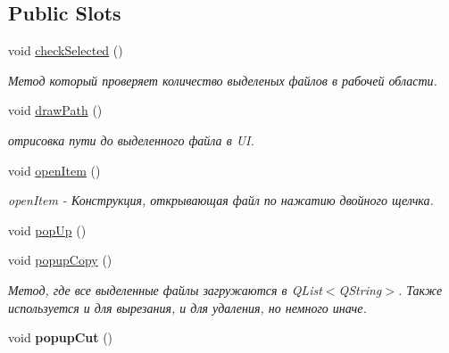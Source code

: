 \subsection*{Public Slots}
\begin{DoxyCompactItemize}
\item 
\mbox{\label{class_custom_tree_adad1ea5f153ee963af8ec30725c56023}} 
void \hyperlink{class_custom_tree_adad1ea5f153ee963af8ec30725c56023}{check\+Selected} ()
\begin{DoxyCompactList}\small\item\em Метод который проверяет количество выделеных файлов в рабочей области. \end{DoxyCompactList}\item 
\mbox{\label{class_custom_tree_a55beb6f033c52341c36a2a8dfc2a1f9f}} 
void \hyperlink{class_custom_tree_a55beb6f033c52341c36a2a8dfc2a1f9f}{draw\+Path} ()
\begin{DoxyCompactList}\small\item\em отрисовка пути до выделенного файла в UI. \end{DoxyCompactList}\item 
\mbox{\label{class_custom_tree_a74d1a0175ab32ba81ddb263b2e276196}} 
void \hyperlink{class_custom_tree_a74d1a0175ab32ba81ddb263b2e276196}{open\+Item} ()
\begin{DoxyCompactList}\small\item\em open\+Item -\/ Конструкция, открывающая файл по нажатию двойного щелчка. \end{DoxyCompactList}\item 
void \hyperlink{class_custom_tree_a183106efb54d0ce0d24da6bdb537002b}{pop\+Up} ()
\item 
void \hyperlink{class_custom_tree_a66a79068ff84c6e74290c9ba0709f770}{popup\+Copy} ()
\begin{DoxyCompactList}\small\item\em Метод, где все выделенные файлы загружаются в Q\+List$<$\+Q\+String$>$. Также используется и для вырезания, и для удаления, но немного иначе. \end{DoxyCompactList}\item 
\mbox{\label{class_custom_tree_ae5f00ca23c452d55edee58e7699347c1}} 
void {\bfseries popup\+Cut} ()
\item 

\end{DoxyCompactItemize}
